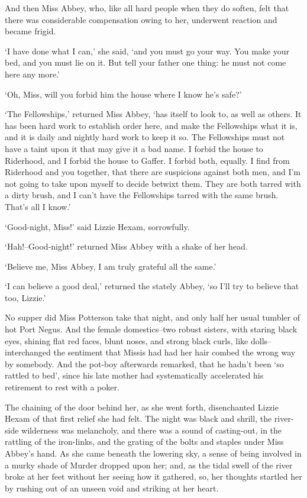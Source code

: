 And then Miss Abbey, who, like all hard people when they do soften,
felt that there was considerable compensation owing to her, underwent
reaction and became frigid.

‘I have done what I can,’ she said, ‘and you must go your way. You make
your bed, and you must lie on it. But tell your father one thing: he
must not come here any more.’

‘Oh, Miss, will you forbid him the house where I know he’s safe?’

‘The Fellowships,’ returned Miss Abbey, ‘has itself to look to, as well
as others. It has been hard work to establish order here, and make the
Fellowships what it is, and it is daily and nightly hard work to keep it
so. The Fellowships must not have a taint upon it that may give it a bad
name. I forbid the house to Riderhood, and I forbid the house to Gaffer.
I forbid both, equally. I find from Riderhood and you together, that
there are suspicions against both men, and I’m not going to take upon
myself to decide betwixt them. They are both tarred with a dirty brush,
and I can’t have the Fellowships tarred with the same brush. That’s all
I know.’

‘Good-night, Miss!’ said Lizzie Hexam, sorrowfully.

‘Hah!--Good-night!’ returned Miss Abbey with a shake of her head.

‘Believe me, Miss Abbey, I am truly grateful all the same.’

‘I can believe a good deal,’ returned the stately Abbey, ‘so I’ll try to
believe that too, Lizzie.’

No supper did Miss Potterson take that night, and only half her usual
tumbler of hot Port Negus. And the female domestics--two robust sisters,
with staring black eyes, shining flat red faces, blunt noses, and strong
black curls, like dolls--interchanged the sentiment that Missis had had
her hair combed the wrong way by somebody. And the pot-boy afterwards
remarked, that he hadn’t been ‘so rattled to bed’, since his late mother
had systematically accelerated his retirement to rest with a poker.

The chaining of the door behind her, as she went forth, disenchanted
Lizzie Hexam of that first relief she had felt. The night was black and
shrill, the river-side wilderness was melancholy, and there was a sound
of casting-out, in the rattling of the iron-links, and the grating of
the bolts and staples under Miss Abbey’s hand. As she came beneath
the lowering sky, a sense of being involved in a murky shade of Murder
dropped upon her; and, as the tidal swell of the river broke at her feet
without her seeing how it gathered, so, her thoughts startled her by
rushing out of an unseen void and striking at her heart.


